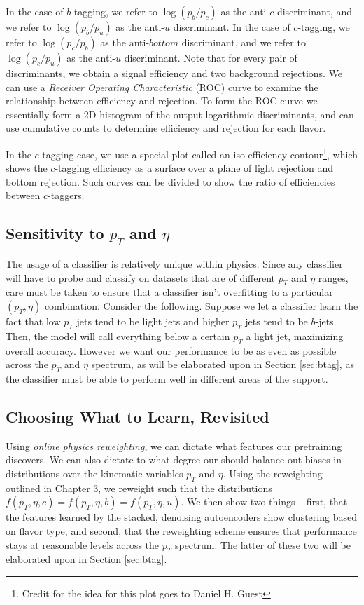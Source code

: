 In the case of $b$-tagging, we refer to $\log(p_b/p_c)$ as the anti-$c$ discriminant, and we refer to $\log(p_b/p_u)$ as the anti-$u$ discriminant. In the case of $c$-tagging, we refer to $\log(p_c/p_b)$ as the anti-$bottom$ discriminant, and we refer to $\log(p_c/p_u)$ as the anti-$u$ discriminant. Note that for every pair of discriminants, we obtain a signal efficiency and two background rejections. We can use a \emph{Receiver Operating Characteristic} (ROC) curve to examine the relationship between efficiency and rejection. To form the ROC curve we essentially form a 2D histogram of the output logarithmic discriminants, and can use cumulative counts to determine efficiency and rejection for each flavor. 

In the $c$-tagging case, we use a special plot called an iso-efficiency contour\footnote{Credit for the idea for this plot goes to Daniel H. Guest}, which shows the $c$-tagging efficiency as a surface over a plane of light rejection and bottom rejection. Such curves can be divided to show the ratio of efficiencies between $c$-taggers.

\subsection{Sensitivity to $p_T$ and $\eta$}

The usage of a classifier is relatively unique within physics. Since any classifier will have to probe and classify on datasets that are of different $p_T$ and $\eta$ ranges, care must be taken to ensure that a classifier isn't overfitting to a particular $(p_T,\eta)$ combination. Consider the following. Suppose we let a classifier learn the fact that low $p_T$ jets tend to be light jets and higher $p_T$ jets tend to be $b$-jets. Then, the model will call everything below a certain $p_T$ a light jet, maximizing overall accuracy. However we want our performance to be as even as possible across the $p_T$ and $\eta$ spectrum, as will be elaborated upon in Section \ref{sec:btag}, as the classifier must be able to perform well in different areas of the support.

\subsection{Choosing What to Learn, Revisited}

Using \emph{online physics reweighting}, we can dictate what features our pretraining discovers. We can also dictate to what degree our \nn{} should balance out biases in distributions over the kinematic variables $p_T$ and $\eta$. Using the reweighting outlined in Chapter 3, we reweight such that the distributions $f(p_T, \eta, c)=f(p_T, \eta, b)=f(p_T, \eta, u)$. We then show two things -- first, that the features learned by the stacked, denoising autoencoders show clustering based on flavor type, and second, that the reweighting scheme ensures that performance stays at reasonable levels across the $p_T$ spectrum. The latter of these two will be elaborated upon in Section \ref{sec:btag}.

